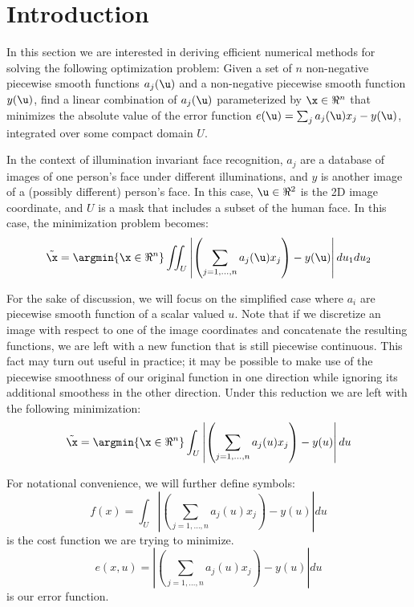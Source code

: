 \section{Introduction} 
% 
In this section we are interested in deriving efficient numerical methods
for solving the following optimization problem:  Given a set of $n$
non-negative piecewise smooth functions $a_j(\u)$ and a non-negative piecewise
smooth function $y(\u)$,  find a linear combination of $a_j(\u)$ parameterized
by $\x \in \Re^n$ that minimizes the absolute value of the error function
$e(\u) = \sum_ja_j(\u) x_j - y(\u)$, integrated over some compact domain $U$.

In the context of illumination invariant face recognition, $a_j$ are a database
of images of one person's face under different illuminations, and $y$ is
another image of a (possibly different) person's face.  In this case, $\u \in
\Re^2$ is the 2D image coordinate, and $U$ is a mask that includes a subset of
the human face.  In this case, the minimization problem becomes:
\begin{equation}
\label{eqn:continuous2D} 
\tilde{\x} = \argmin{\x\in \Re^n} \iint_U{\left|\left(\sum_{j=1,\ldots,n} a_j(\u) x_j\right) - y(\u)\right| du_1 du_2} 
\end{equation}

For the sake of discussion, we will focus on the simplified case where $a_i$
are piecewise smooth function of a scalar valued $u$.  Note that if we
discretize an image with respect to one of the image coordinates and
concatenate the resulting functions, we are left with a new function that is
still piecewise continuous.  This fact may turn out useful in practice; it may
be possible to make use of the piecewise smoothness of our original function in
one direction while ignoring its additional smoothess in the other direction.
Under this reduction we are left with the following minimization:
\begin{equation}\label{eqn:continuous1D}
\tilde{\x} = \argmin{\x\in \Re^n} \int_U{ \left|\left(\sum_{j=1,\ldots,n} a_j(u) x_j\right) - y(u)\right| du}
\end{equation}

For notational convenience, we will further define symbols:
\begin{equation}
 f(x) = \int_U{ \left|\left(\sum_{j=1,\ldots,n} a_j(u) x_j\right) - y(u)\right| du}
\end{equation}
is the cost function we are trying to minimize.
\begin{equation}
 e(x,u) = \left|\left(\sum_{j=1,\ldots,n} a_j(u) x_j\right) - y(u)\right| du
\end{equation}
is our error function.

